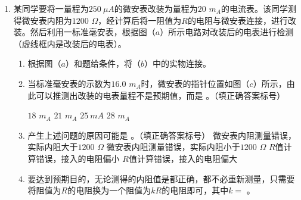 
\begin{enumerate}[leftmargin=0em]
\renewcommand{\labelenumi}{\arabic{enumi}.}
\item
{}
某同学要将一量程为$ 250 \ \mu A $的微安表改装为量程为$ 20 $ $ m_{A} $的电流表。该同学测得微安表内阻为$ 1 200 $ $ \Omega $，经计算后将一阻值为$ R $的电阻与微安表连接，进行改装。然后利用一标准毫安表，根据图（$ a $）所示电路对改装后的电表进行检测（虚线框内是改装后的电表）。
\begin{figure}[h!]
\centering

\end{figure}

\begin{enumerate}
\renewcommand{\labelenumi}{\arabic{enumi}.}
\item
根据图（$ a $）和题给条件，将（$ b $）中的实物连接。
\item 
当标准毫安表的示数为$ 16.0 $ $ m_{A} $时，微安表的指针位置如图（$ c $）所示，由此可以推测出改装的电表量程不是预期值，而是  
。（填正确答案标号）
\begin{figure}[h!]
\centering

\end{figure}

\fourchoices
{$ 18 $ $ m_{A} $ }
{$ 21 $ $ m_{A} $}
{$ 25 \ mA $ }
{$ 28 $ $ m_{A} $}


\item 
产生上述问题的原因可能是  
。（填正确答案标号）
\fourchoices
{微安表内阻测量错误，实际内阻大于$ 1 200 $ $ \Omega $}
{微安表内阻测量错误，实际内阻小于$ 1 200 $ $ \Omega $}
{$ R $值计算错误，接入的电阻偏小}
{$ R $值计算错误，接入的电阻偏大}

\item 
要达到预期目的，无论测得的内阻值是都正确，都不必重新测量，只需要将阻值为$ R $的电阻换为一个阻值为$ kR $的电阻即可，其中$ k= $  。



\end{enumerate}


\end{enumerate}

